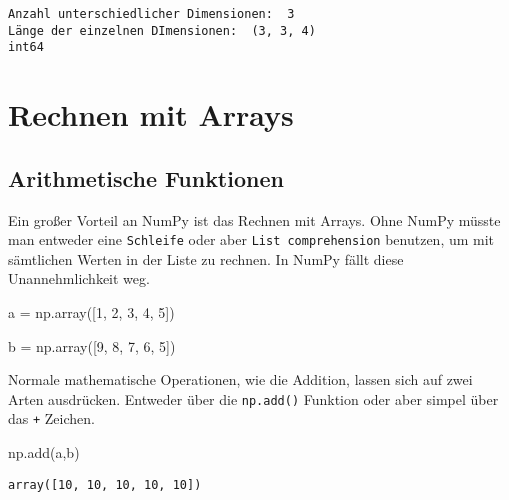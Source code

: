 \documentclass[
  letterpaper,
  DIV=11,
  numbers=noendperiod]{scrreprt}
\newenvironment{Shaded}{\begin{snugshade}}{\end{snugshade}}
\newcommand{\DecValTok}[1]{\textcolor[rgb]{0.68,0.00,0.00}{#1}}
\newcommand{\NormalTok}[1]{\textcolor[rgb]{0.00,0.23,0.31}{#1}}
\newcommand{\OperatorTok}[1]{\textcolor[rgb]{0.37,0.37,0.37}{#1}}
\begin{document}
\begin{tcolorbox}
\begin{tcolorbox}
\begin{tcolorbox}
\begin{verbatim}
Anzahl unterschiedlicher Dimensionen:  3
Länge der einzelnen DImensionen:  (3, 3, 4)
int64
\end{verbatim}

\end{tcolorbox}

\end{tcolorbox}

\chapter{Rechnen mit Arrays}\label{rechnen-mit-arrays}

\section{Arithmetische Funktionen}\label{arithmetische-funktionen}

Ein großer Vorteil an NumPy ist das Rechnen mit Arrays. Ohne NumPy
müsste man entweder eine \texttt{Schleife} oder aber
\texttt{List\ comprehension} benutzen, um mit sämtlichen Werten in der
Liste zu rechnen. In NumPy fällt diese Unannehmlichkeit weg.

\begin{Shaded}
\begin{Highlighting}[]
\NormalTok{a }\OperatorTok{=}\NormalTok{ np.array([}\DecValTok{1}\NormalTok{, }\DecValTok{2}\NormalTok{, }\DecValTok{3}\NormalTok{, }\DecValTok{4}\NormalTok{, }\DecValTok{5}\NormalTok{])}

\NormalTok{b }\OperatorTok{=}\NormalTok{ np.array([}\DecValTok{9}\NormalTok{, }\DecValTok{8}\NormalTok{, }\DecValTok{7}\NormalTok{, }\DecValTok{6}\NormalTok{, }\DecValTok{5}\NormalTok{])}
\end{Highlighting}
\end{Shaded}

Normale mathematische Operationen, wie die Addition, lassen sich auf
zwei Arten ausdrücken. Entweder über die \texttt{np.add()} Funktion oder
aber simpel über das \texttt{+} Zeichen.

\begin{Shaded}
\begin{Highlighting}[]
\NormalTok{np.add(a,b)}
\end{Highlighting}
\end{Shaded}

\begin{verbatim}
array([10, 10, 10, 10, 10])
\end{verbatim}


\end{tcolorbox}
\end{document}
